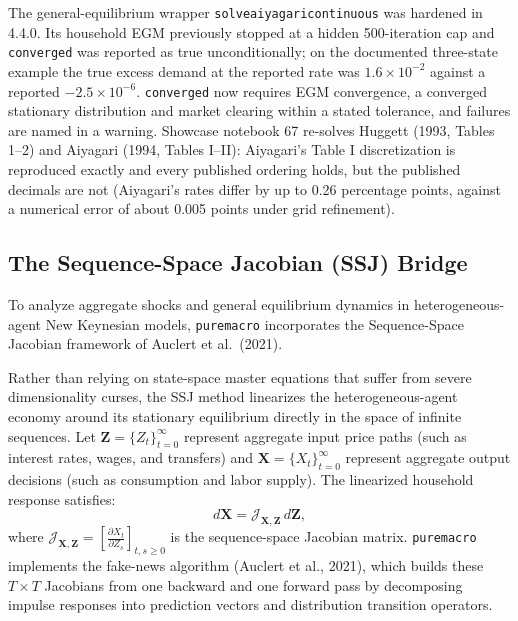 \documentclass[11pt,letterpaper]{article}
\renewcommand{\_}{\pmunderscore\allowbreak}
\begin{document}
The general-equilibrium wrapper \texttt{solve\_aiyagari\_continuous} was hardened in 4.4.0. Its household EGM previously stopped at a hidden 500-iteration cap and \texttt{converged} was reported as true unconditionally; on the documented three-state example the true excess demand at the reported rate was \(1.6\times10^{-2}\) against a reported \(-2.5\times10^{-6}\). \texttt{converged} now requires EGM convergence, a converged stationary distribution and market clearing within a stated tolerance, and failures are named in a warning. Showcase notebook 67 re-solves Huggett (1993, Tables 1--2) and Aiyagari (1994, Tables I--II): Aiyagari's Table I discretization is reproduced exactly and every published ordering holds, but the published decimals are not (Aiyagari's rates differ by up to 0.26 percentage points, against a numerical error of about 0.005 points under grid refinement).

\subsection{The Sequence-Space Jacobian (SSJ) Bridge}\label{the-sequence-space-jacobian-ssj-bridge}

To analyze aggregate shocks and general equilibrium dynamics in heterogeneous-agent New Keynesian models, \texttt{puremacro} incorporates the Sequence-Space Jacobian framework of Auclert et al.~(2021).

Rather than relying on state-space master equations that suffer from severe dimensionality curses, the SSJ method linearizes the heterogeneous-agent economy around its stationary equilibrium directly in the space of infinite sequences. Let \(\mathbf{Z} = \{Z_t\}_{t=0}^\infty\) represent aggregate input price paths (such as interest rates, wages, and transfers) and \(\mathbf{X} = \{X_t\}_{t=0}^\infty\) represent aggregate output decisions (such as consumption and labor supply). The linearized household response satisfies:
\[d\mathbf{X} = \mathcal{J}_{\mathbf{X}, \mathbf{Z}} \, d\mathbf{Z},\]
where \(\mathcal{J}_{\mathbf{X}, \mathbf{Z}} = \left[ \frac{\partial X_t}{\partial Z_s} \right]_{t, s \ge 0}\) is the sequence-space Jacobian matrix. \texttt{puremacro} implements the fake-news algorithm (Auclert et al., 2021), which builds these \(T \times T\) Jacobians from one backward and one forward pass by decomposing impulse responses into prediction vectors and distribution transition operators.
\end{document}
